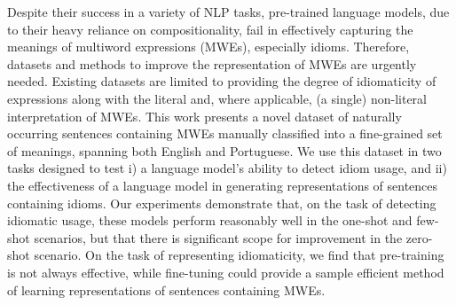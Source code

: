 Despite their success in a variety of NLP tasks, pre-trained language models, due to their heavy reliance on compositionality, fail in effectively capturing the meanings of multiword expressions (MWEs), especially idioms. Therefore, datasets and methods to improve the representation of MWEs are urgently needed. Existing datasets are limited to providing the degree of idiomaticity of expressions along with the literal and, where applicable, (a single) non-literal interpretation of MWEs. This work presents a novel dataset of naturally occurring sentences containing MWEs manually classified into a fine-grained set of meanings, spanning both English and Portuguese. We use this dataset in two tasks designed to test i) a language model's ability to detect idiom usage, and ii) the effectiveness of a language model in generating representations of sentences containing idioms. Our experiments demonstrate that, on the task of detecting idiomatic usage, these models perform reasonably well in the one-shot and few-shot scenarios, but that there is significant scope for improvement in the zero-shot scenario. On the task of representing idiomaticity, we find that pre-training is not always effective, while fine-tuning could provide a sample efficient method of learning representations of sentences containing MWEs.
